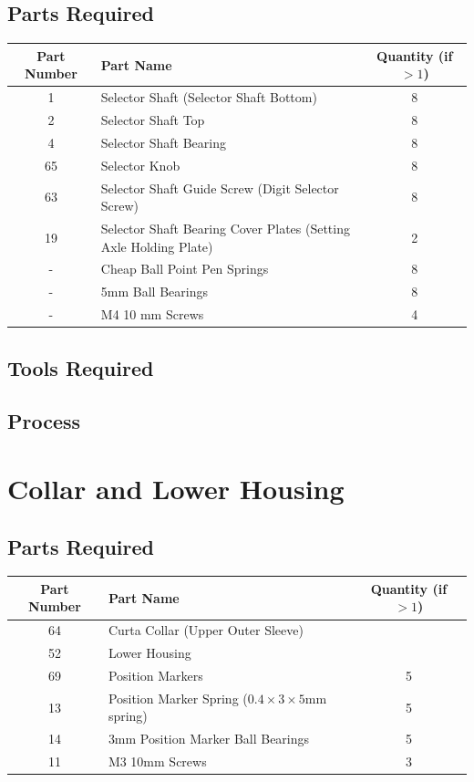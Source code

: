 \documentclass{article}
\begin{document}
\subsection{Parts Required}
\begin{table}[h!]
	\centering
	\begin{tabular}{clc}
		Part Number & Part Name & Quantity (if $>1$) \\ \hline
		1 & Selector Shaft (Selector Shaft Bottom) & 8 \\
		2 & Selector Shaft Top & 8 \\
		4 & Selector Shaft Bearing & 8 \\
		65 & Selector Knob & 8 \\
		63 & Selector Shaft Guide Screw (Digit Selector Screw) & 8 \\
		19 & Selector Shaft Bearing Cover Plates (Setting Axle Holding Plate) & 2 \\ \hline \hline 
		- & Cheap Ball Point Pen Springs & 8 \\
		- & 5mm Ball Bearings & 8 \\
		- & M4 10 mm Screws & 4
	\end{tabular}
\end{table}


\subsection{Tools Required}

\subsection{Process}


\newpage
\section{Collar and Lower Housing}
\subsection{Parts Required}
\begin{table}[h!]
	\centering
	\begin{tabular}{clc}
		Part Number & Part Name & Quantity (if $>1$) \\ \hline
		64 & Curta Collar (Upper Outer Sleeve) & \\
		52 & Lower Housing & \\
		69 & Position Markers & 5 \\ \hline \hline
		13 & Position Marker Spring ($0.4\times3\times5$mm spring) & 5 \\
		14 & 3mm Position Marker Ball Bearings & 5 \\
		11 & M3 10mm Screws & 3
	\end{tabular}
\end{table}
\end{document}
